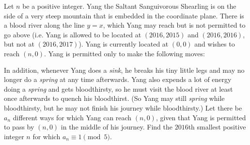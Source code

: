 Let $n$ be a positive integer. Yang the Saltant Sanguivorous Shearling is on the side of a very steep mountain that is embedded in the coordinate plane. There is a blood river along the line $y=x$, which Yang may reach but is not permitted to go above (i.e. Yang is allowed to be located at $(2016,2015)$ and $(2016,2016)$, but not at $(2016,2017)$). Yang is currently located at $(0,0)$ and wishes to reach $(n,0)$. Yang is permitted only to make the following moves:

\begin{itemize}
\end{itemize}

In addition, whenever Yang does a \emph{sink}, he breaks his tiny little legs and may no longer do a \emph{spring} at any time afterwards. Yang also expends a lot of energy doing a \emph{spring} and gets bloodthirsty, so he must visit the blood river at least once afterwards to quench his bloodthirst. (So Yang may still \emph{spring} while bloodthirsty, but he may not finish his journey while bloodthirsty.) Let there be $a_n$ different ways for which Yang can reach $(n,0)$, given that Yang is permitted to pass by $(n,0)$ in the middle of his journey. Find the $2016$th smallest positive integer $n$ for which $a_n\equiv 1\pmod 5$.
